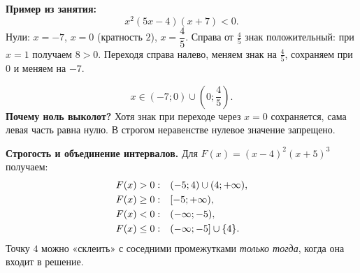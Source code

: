 \documentclass[a4paper,12pt]{article}
\newcommand{\strong}[1]{{\color{darkaccent}\textbf{#1}}}
\begin{document}
\textbf{Пример из занятия:}
\[
 x^2(5x-4)(x+7)<0.
\]
Нули: $x=-7$, $x=0$ (кратность $2$), $x=\dfrac45$.
Справа от $\frac45$ знак положительный: при $x=1$ получаем $8>0$.
Переходя справа налево, меняем знак на $\frac45$, сохраняем при $0$
и меняем на $-7$.

\begin{center}
\end{center}
\[
\boxed{x\in(-7;0)\cup\left(0;\frac45\right).}
\]
\strong{Почему ноль выколот?} Хотя знак при переходе через $x=0$
сохраняется, сама левая часть равна нулю. В строгом неравенстве
нулевое значение запрещено.

\textbf{Строгость и объединение интервалов.}
Для $F(x)=(x-4)^2(x+5)^3$ получаем:
\[
\begin{array}{@{}ll@{}}
F(x)>0: & (-5;4)\cup(4;+\infty),\\[1mm]
F(x)\ge0: & [-5;+\infty),\\[1mm]
F(x)<0: & (-\infty;-5),\\[1mm]
F(x)\le0: & (-\infty;-5]\cup\{4\}.
\end{array}
\]
Точку $4$ можно «склеить» с соседними промежутками \emph{только тогда},
когда она входит в решение.

\clearpage
\end{document}
